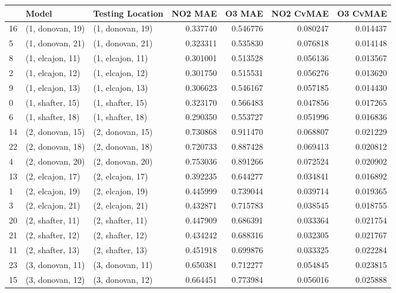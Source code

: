 \begin{tabular}{lllrrrr}
\toprule
{} &             Model &  Testing Location &   NO2 MAE &    O3 MAE &  NO2 CvMAE &  O3 CvMAE \\
\midrule
16 &  (1, donovan, 19) &  (1, donovan, 19) &  0.337740 &  0.546776 &   0.080247 &  0.014437 \\
5  &  (1, donovan, 21) &  (1, donovan, 21) &  0.323311 &  0.535830 &   0.076818 &  0.014148 \\
8  &  (1, elcajon, 11) &  (1, elcajon, 11) &  0.301001 &  0.513528 &   0.056136 &  0.013567 \\
2  &  (1, elcajon, 12) &  (1, elcajon, 12) &  0.301750 &  0.515531 &   0.056276 &  0.013620 \\
9  &  (1, elcajon, 13) &  (1, elcajon, 13) &  0.306623 &  0.546167 &   0.057185 &  0.014430 \\
0  &  (1, shafter, 15) &  (1, shafter, 15) &  0.323170 &  0.566483 &   0.047856 &  0.017265 \\
6  &  (1, shafter, 18) &  (1, shafter, 18) &  0.290350 &  0.553727 &   0.051996 &  0.016836 \\
14 &  (2, donovan, 15) &  (2, donovan, 15) &  0.730868 &  0.911470 &   0.068807 &  0.021229 \\
22 &  (2, donovan, 18) &  (2, donovan, 18) &  0.720733 &  0.887428 &   0.069413 &  0.020812 \\
4  &  (2, donovan, 20) &  (2, donovan, 20) &  0.753036 &  0.891266 &   0.072524 &  0.020902 \\
13 &  (2, elcajon, 17) &  (2, elcajon, 17) &  0.392235 &  0.644277 &   0.034841 &  0.016892 \\
1  &  (2, elcajon, 19) &  (2, elcajon, 19) &  0.445999 &  0.739044 &   0.039714 &  0.019365 \\
3  &  (2, elcajon, 21) &  (2, elcajon, 21) &  0.432871 &  0.715783 &   0.038545 &  0.018755 \\
20 &  (2, shafter, 11) &  (2, shafter, 11) &  0.447909 &  0.686391 &   0.033364 &  0.021754 \\
21 &  (2, shafter, 12) &  (2, shafter, 12) &  0.434242 &  0.688316 &   0.032305 &  0.021767 \\
11 &  (2, shafter, 13) &  (2, shafter, 13) &  0.451918 &  0.699876 &   0.033325 &  0.022284 \\
23 &  (3, donovan, 11) &  (3, donovan, 11) &  0.650381 &  0.712277 &   0.054845 &  0.023815 \\
15 &  (3, donovan, 12) &  (3, donovan, 12) &  0.664451 &  0.773984 &   0.056016 &  0.025888 \\

\end{tabular}
